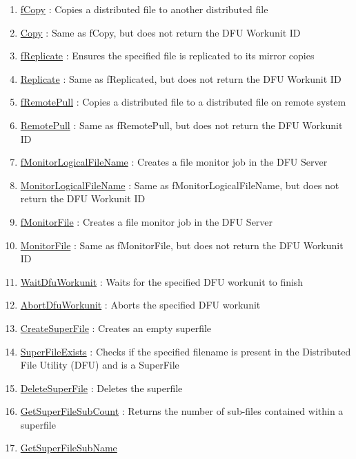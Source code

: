 \begin{enumerate}
\item \hyperlink{ecldoc:file.fcopy}{fCopy}
: Copies a distributed file to another distributed file
\item \hyperlink{ecldoc:file.copy}{Copy}
: Same as fCopy, but does not return the DFU Workunit ID
\item \hyperlink{ecldoc:file.freplicate}{fReplicate}
: Ensures the specified file is replicated to its mirror copies
\item \hyperlink{ecldoc:file.replicate}{Replicate}
: Same as fReplicated, but does not return the DFU Workunit ID
\item \hyperlink{ecldoc:file.fremotepull}{fRemotePull}
: Copies a distributed file to a distributed file on remote system
\item \hyperlink{ecldoc:file.remotepull}{RemotePull}
: Same as fRemotePull, but does not return the DFU Workunit ID
\item \hyperlink{ecldoc:file.fmonitorlogicalfilename}{fMonitorLogicalFileName}
: Creates a file monitor job in the DFU Server
\item \hyperlink{ecldoc:file.monitorlogicalfilename}{MonitorLogicalFileName}
: Same as fMonitorLogicalFileName, but does not return the DFU Workunit ID
\item \hyperlink{ecldoc:file.fmonitorfile}{fMonitorFile}
: Creates a file monitor job in the DFU Server
\item \hyperlink{ecldoc:file.monitorfile}{MonitorFile}
: Same as fMonitorFile, but does not return the DFU Workunit ID
\item \hyperlink{ecldoc:file.waitdfuworkunit}{WaitDfuWorkunit}
: Waits for the specified DFU workunit to finish
\item \hyperlink{ecldoc:file.abortdfuworkunit}{AbortDfuWorkunit}
: Aborts the specified DFU workunit
\item \hyperlink{ecldoc:file.createsuperfile}{CreateSuperFile}
: Creates an empty superfile
\item \hyperlink{ecldoc:file.superfileexists}{SuperFileExists}
: Checks if the specified filename is present in the Distributed File Utility (DFU) and is a SuperFile
\item \hyperlink{ecldoc:file.deletesuperfile}{DeleteSuperFile}
: Deletes the superfile
\item \hyperlink{ecldoc:file.getsuperfilesubcount}{GetSuperFileSubCount}
: Returns the number of sub-files contained within a superfile
\item \hyperlink{ecldoc:file.getsuperfilesubname}{GetSuperFileSubName}

\end{enumerate}
